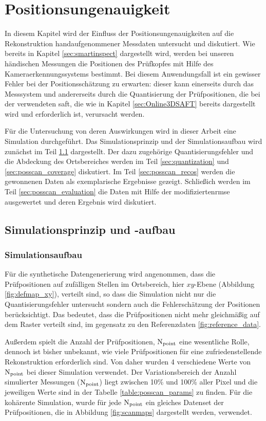 \chapter{Positionsungenauigkeit} \label{chap:posscan}

In diesem Kapitel wird der Einfluss der Positionsungenauigkeiten auf die Rekonstruktion handaufgenommener Messdaten untersucht und diskutiert. Wie bereits in Kapitel \ref{sec:smartinspect} dargestellt wird, werden bei unseren händischen Messungen die Positionen des Prüfkopfes mit Hilfe des Kameraerkennungssystems bestimmt. Bei diesem Anwendungsfall ist ein gewisser Fehler bei der Positionsschätzung zu erwarten: dieser kann einerseits durch das Messsystem und andererseits durch die Quantisierung der Prüfpositionen, die bei der verwendeten \acrshort{saft}, die wie in Kapitel \ref{sec:Online3DSAFT} bereits dargestellt wird und erforderlich ist, verursacht werden. \par
Für die Untersuchung von deren Auswirkungen wird in dieser Arbeit eine Simulation durchgeführt. Das Simulationsprinzip und der Simulationsaufbau wird zunächst im Teil \ref{sec:posscan_setup} dargestellt. Der dazu zugehörige Quantisierungsfehler und die Abdeckung des Ortsbereiches werden im Teil \ref{sec:quantization} und \ref{sec:posscan_coverage} diskutiert. Im Teil \ref{sec:posscan_recos} werden die gewonnenen Daten als exemplarische Ergebnisse gezeigt. Schließich werden im Teil \ref{sec:posscan_evaluation} die Daten mit Hilfe der  modifizierten\acrshort{rmse} ausgewertet und deren Ergebnis wird diskutiert.  

\section{Simulationsprinzip und -aufbau} \label{sec:posscan_setup}
\subsection{Simulationsaufbau} %
Für die synthetische Datengenerierung wird angenommen, dass die Prüfpositionen auf zufälligen Stellen im Ortsbereich, hier $xy$-Ebene (Abbildung \ref{fig:defmap_xy}), verteilt sind, so dass die Simulation nicht nur die Quantisierungsfehler untersucht sondern auch die Fehlerschätzung der Positionen berücksichtigt. Das bedeutet, dass die Prüfpositionen nicht mehr gleichmäßig auf dem Raster verteilt sind, im gegensatz zu den Referenzdaten \ref{fig:reference_data}. \par
Außerdem spielt die Anzahl der Prüfpositionen, $\operatorname{N}_{\operatorname{point}}$ eine wesentliche Rolle, dennoch ist bisher unbekannt, wie viele Prüfpositionen für eine zufriedenstellende Rekonstruktion erforderlich sind. Von daher wurden 4 verschiedene Werte von $\operatorname{N}_{\operatorname{point}}$ bei dieser Simulation verwendet. Der Variationsbereich der Anzahl simulierter Messungen ($\operatorname{N}_{\operatorname{point}}$) liegt zwischen 10\% und 100\% aller Pixel und die jeweiligen Werte sind in der Tabelle \ref{table:posscan_params} zu finden. Für die kohärente Simulation, wurde für jede $\operatorname{N}_{\operatorname{point}}$ ein gleiches Datenset der Prüfpositionen, die in Abbildung \ref{fig:scanmaps} dargestellt werden, verwendet. \par


